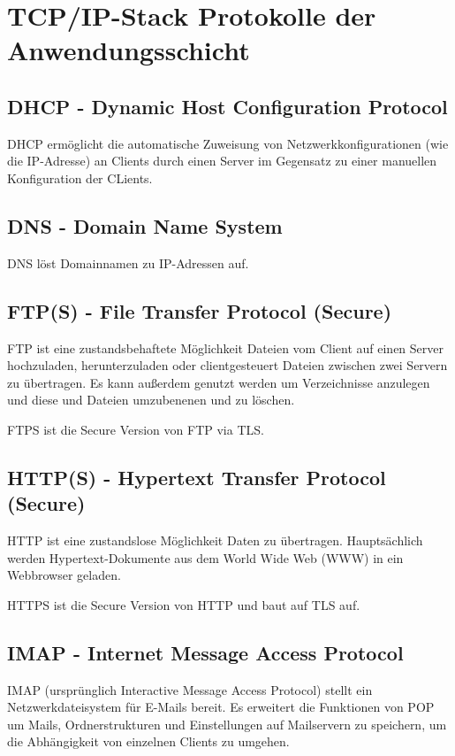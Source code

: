 \section{TCP/IP-Stack Protokolle der Anwendungsschicht}

\subsection{DHCP - Dynamic Host Configuration Protocol}

DHCP ermöglicht die automatische Zuweisung von Netzwerkkonfigurationen (wie die IP-Adresse) an Clients durch einen Server im Gegensatz zu einer manuellen Konfiguration der CLients.

\subsection{DNS - Domain Name System}

DNS löst Domainnamen zu IP-Adressen auf.

\subsection{FTP(S) - File Transfer Protocol (Secure)}

FTP ist eine zustandsbehaftete Möglichkeit Dateien vom Client auf einen Server hochzuladen, herunterzuladen oder clientgesteuert Dateien zwischen zwei Servern zu übertragen. Es kann außerdem genutzt werden um Verzeichnisse anzulegen und diese und Dateien umzubenenen und zu löschen.

FTPS ist die Secure Version von FTP via TLS.

\subsection{HTTP(S) - Hypertext Transfer Protocol (Secure)}

HTTP ist eine zustandslose Möglichkeit Daten zu übertragen. Hauptsächlich werden Hypertext-Dokumente aus dem World Wide Web (WWW) in ein Webbrowser geladen.

HTTPS ist die Secure Version von HTTP und baut auf TLS auf.


\subsection{IMAP - Internet Message Access Protocol}

IMAP (ursprünglich Interactive Message Access Protocol) stellt ein Netzwerkdateisystem für E-Mails bereit. Es erweitert die Funktionen von POP um Mails, Ordnerstrukturen und Einstellungen auf Mailservern zu speichern, um die Abhängigkeit von einzelnen Clients zu umgehen.

